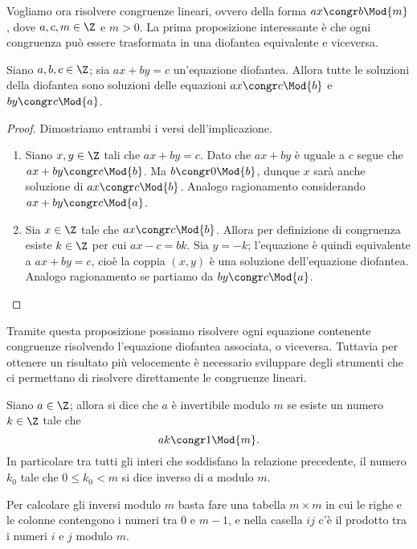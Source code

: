 Vogliamo ora risolvere congruenze lineari, ovvero della forma $ax \congr b \Mod{m}$, dove $a, c, m \in \Z$ e $m > 0$. La prima proposizione interessante è che ogni congruenza può essere trasformata in una diofantea equivalente e viceversa.

\begin{proposition}
    Siano $a, b, c \in \Z$; sia $ax + by = c$ un'equazione diofantea. Allora tutte le soluzioni della diofantea sono soluzioni delle equazioni $ax \congr c \Mod{b}$ e $by \congr c \Mod{a}$.
\end{proposition}
\begin{proof}
    Dimostriamo entrambi i versi dell'implicazione.
    \begin{enumerate}
        \item Siano $x, y \in \Z$ tali che $ax + by = c$. Dato che $ax + by$ è uguale a $c$ segue che $ax + by \congr c \Mod{b}$. Ma $b \congr 0 \Mod{b}$, dunque $x$ sarà anche soluzione di $ax \congr c \Mod{b}$. Analogo ragionamento considerando $ax + by \congr c \Mod{a}$.
        \item Sia $x \in \Z$ tale che $ax \congr c \Mod{b}$. Allora per definizione di congruenza esiste $k \in \Z$ per cui $ax - c = bk$. Sia $y = -k$; l'equazione è quindi equivalente a $ax + by = c$, cioè la coppia $(x, y)$ è una soluzione dell'equazione diofantea. Analogo ragionamento se partiamo da $by \congr c \Mod{a}$. \qedhere
    \end{enumerate}
\end{proof}

Tramite questa proposizione possiamo risolvere ogni equazione contenente congruenze risolvendo l'equazione diofantea associata, o viceversa. Tuttavia per ottenere un risultato più velocemente è necessario sviluppare degli strumenti che ci permettano di risolvere direttamente le congruenze lineari.

\begin{definition}
    Siano $a \in \Z$; allora si dice che $a$ è invertibile modulo $m$ se esiste un numero $k \in \Z$ tale che \[
        ak \congr 1 \Mod{m}
    .\]
    In particolare tra tutti gli interi che soddisfano la relazione precedente, il numero $k_0$ tale che $0 \leq k_0 < m$ si dice inverso di $a$ modulo $m$.
\end{definition}

Per calcolare gli inversi modulo $m$ basta fare una tabella $m \times m$ in cui le righe e le colonne contengono i numeri tra $0$ e $m-1$, e nella casella $ij$ c'è il prodotto tra i numeri $i$ e $j$ modulo $m$.


